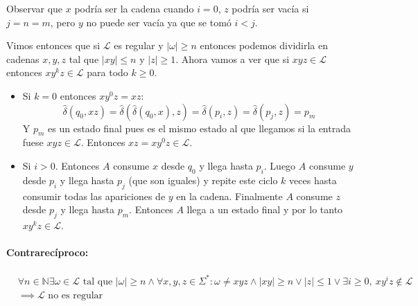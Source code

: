 \begin{demoPart}[0.8\textwidth]

  Observar que \(x\) podría ser la cadena cuando \(i = 0\), \(z\) podría ser vacía si \(j = n = m\), pero \(y\) no puede ser vacía ya que se tomó \(i < j\).

  Vimos entonces que si \(\mathcal{L}\) es regular y \(|\omega| \geq n\) entonces podemos dividirla en cadenas \(x,y,z\) tal que \(|xy|\leq n\) y \(|z|\geq 1\). Ahora vamos a ver que si \(xyz \in \mathcal{L}\) entonces \(xy^kz \in \mathcal{L}\) para todo \(k\geq 0\).

  \begin{itemize}
    \item Si \(k = 0\) entonces \(xy^0z = xz\):
          \[\hat\delta(q_0, xz) = \hat\delta(\hat\delta(q_0, x), z) = \hat\delta(p_i, z) = \hat\delta(p_j, z) = p_m\]
          Y \(p_m\) es un estado final pues es el mismo estado al que llegamos si la entrada fuese \(xyz\in\mathcal{L}\). Entonces \(xz = xy^0z \in \mathcal{L}\).
    \item Si \(i > 0\). Entonces \(A\) consume \(x\) desde \(q_0\) y llega hasta \(p_i\). Luego \(A\) consume \(y\) desde \(p_i\) y llega hasta \(p_j\) (que son iguales) y repite este ciclo \(k\) veces hasta consumir todas las apariciones de \(y\) en la cadena. Finalmente \(A\) consume \(z\) desde \(p_j\) y llega hasta \(p_m\). Entonces \(A\) llega a un estado final y por lo tanto \(xy^kz \in \mathcal{L}\).
  \end{itemize}
\end{demoPart}
\paragraph{Contrarecíproco:}
\begin{align*}
   & \forall   n\in\mathbb{N}  \exists\omega\in\mathcal{L}\text{ tal que } |\omega|\geq n \land  \forall x,y,z\in\Sigma^*: \omega\neq xyz \land|xy|\geq n\lor|z|\leq 1 \lor \exists i\geq 0,~ xy^iz\notin\mathcal{L} \\ &
  \implies \mathcal{L}\text{  no es regular}                                                                                                                                                                         \\
\end{align*}